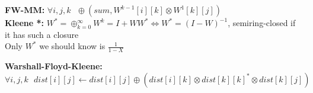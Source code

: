 \textbf{FW-MM:} $\forall i,j,k \text{ } \oplus (sum,W^{k-1}[i][k] \otimes W^{1}[k][j])$\\


\textbf{Kleene *:} $W^* = \oplus_{k=0}^\infty W^k = I+WW^* \Leftrightarrow W^* = (I-W)^{-1}$, semiring-closed if it has such a closure\\
Only $W^*$ we should know is $\frac{1}{1-X}$\\
\begin{comment}
	The last equation comes from the geometric series.\\
\end{comment} 

\textbf{Warshall-Floyd-Kleene:} $\forall i,j,k \text{ } dist[i][j] \leftarrow dist[i][j]\oplus (dist[i][k] \otimes dist[k][k]^* \otimes dist[k][j])$









